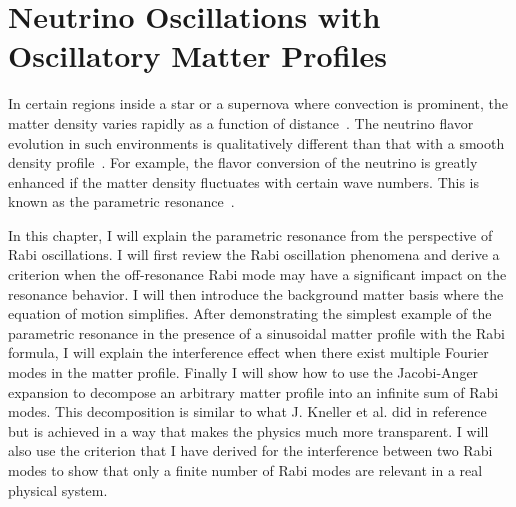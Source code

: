 
\chapter{\label{chap:matter}Neutrino Oscillations with Oscillatory Matter Profiles}

In certain regions inside a star or a supernova where convection is prominent, the matter density varies rapidly as a function of distance~\cite{Muller2015, Couch2015}. The neutrino flavor evolution in such environments is qualitatively different than that with a smooth density profile~\cite{Krastev1989, Loreti1994,Akhmedov2000, Friedland2006,Kneller2010,Kneller2013,Patton2014}. For example, the flavor conversion of the neutrino is greatly enhanced if the matter density fluctuates with certain wave numbers. This is known as the parametric resonance~\cite{Krastev1989,Akhmedov1999}.

In this chapter, I will explain the parametric resonance from the perspective of Rabi oscillations. I will first review the Rabi oscillation phenomena and derive a criterion when the off-resonance Rabi mode may have a significant impact on the resonance behavior. I will then introduce the background matter basis where the equation of motion simplifies. After demonstrating the simplest example of the parametric resonance in the presence of a sinusoidal matter profile with the Rabi formula, I will explain the interference effect when there exist multiple Fourier modes in the matter profile. Finally I will show how to use the Jacobi-Anger expansion to decompose an arbitrary matter profile into an infinite sum of Rabi modes. This decomposition is similar to what J. Kneller et al. did in reference \cite{Kneller2013,Patton2014} but is achieved in a way that makes the physics much more transparent. I will also use the criterion that I have derived for the interference between two Rabi modes to show that only a finite number of Rabi modes are relevant in a real physical system.




